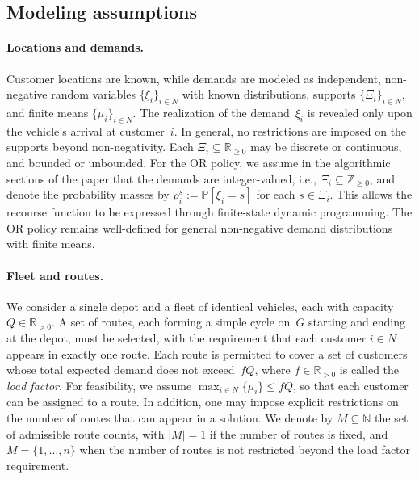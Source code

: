 \documentclass{article}
\newcommand{\rev}[1]{{\color{black}#1}}
\begin{document}
\rev{
\subsection{Modeling assumptions}\label{subsec:assumptions}

\paragraph{Locations and demands.}
Customer locations are known, while demands are modeled as independent, non-negative random variables $\{\xi_i\}_{i \in N}$ with known distributions, supports $\{\Xi_i\}_{i \in N}$, and finite means $\{\mu_i\}_{i \in N}$. The realization of the demand~$\xi_i$ is revealed only upon the vehicle's arrival at customer~$i$. In general, no restrictions are imposed on the supports beyond non-negativity. Each $\Xi_i \subseteq \mathbb{R}_{\geq 0}$ may be discrete or continuous, and bounded or unbounded. For the OR policy, we assume in the algorithmic sections of the paper that the demands are integer-valued, i.e., $\Xi_i \subseteq \mathbb{Z}_{\geq 0}$, and denote the probability masses by $\rho^s_i := \mathbb{P}[\xi_i = s]$ for each $s \in \Xi_i$. This allows the recourse function to be expressed through finite-state dynamic programming. The OR policy remains well-defined for general non-negative demand distributions with finite means. 
 
\paragraph{Fleet and routes.}
We consider a single depot and a fleet of identical vehicles, each with capacity~$Q \in \mathbb{R}_{> 0}$. A set of routes, each forming a simple cycle on~$G$ starting and ending at the depot, must be selected, with the requirement that each customer $i \in N$ appears in exactly one route. Each route is permitted to cover a set of customers whose total expected demand does not exceed~$fQ$, where $f \in \mathbb{R}_{>0}$ is called the \textit{load factor}. For feasibility, we assume $\max_{i \in N}\{\mu_i\} \leq fQ$, so that each customer can be assigned to a route. In addition, one may impose explicit restrictions on the number of routes that can appear in a solution. We denote by $M \subseteq \mathbb{N}$ the set of admissible route counts, with $|M|=1$ if the number of routes is fixed, and $M = \{1, \dots, n\}$ when the number of routes is not restricted beyond the load factor requirement. 
 
}
\end{document}
